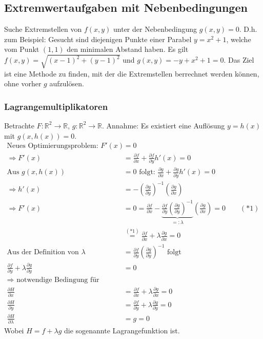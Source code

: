 \documentclass[12pt,a4paper]{report}%
\numberwithin{equation}{section}
\newcommand{\R}{\mathbb{R}} %
\newcommand{\diffp}{\partial}
\numberwithin{equation}{subsection}
\begin{document}
  \subsection{Extremwertaufgaben mit Nebenbedingungen}
  Suche Extremstellen von $f(x,y)$ unter der Nebenbedingung $g(x,y) = 0$.
  D.h. zum Beispiel: Gesucht sind diejenigen Punkte einer Parabel $y = x^2+1$, welche vom Punkt $(1,1)$ den minimalen Abstand haben. Es gilt $f(x,y) = \sqrt{(x-1)^2+(y-1)^2}$ und $g(x,y) = -y+x^2+1 = 0$.\newline
  Das Ziel ist eine Methode zu finden, mit der die Extremstellen berrechnet werden können, ohne vorher $g$ aufzulösen.
  \subsubsection{Lagrangemultiplikatoren}
  Betrachte $F:\R^2 \rightarrow \R$, $g:\R^2 \rightarrow \R$.\newline
  Annahme: Es existiert eine Auflösung $y = h(x)$ mit $g(x,h(x)) = 0$.\newline
  \begin{align*}
    \text{Neues Optimierungsproblem: } F'(x) &= 0 \\
    \Rightarrow F'(x) &= \frac{\diffp f}{\diffp x} + \frac{\diffp f}{\diffp y} h'(x) = 0\\
    \text{Aus } g(x,h(x)) &= 0 \text{ folgt: } \frac{\diffp g}{\diffp x} + \frac{\diffp g}{\diffp y} h'(x) = 0 \\
    \Rightarrow h'(x) &= -\left(\frac{\diffp g}{\diffp y}\right)^{-1} \left(\frac{\diffp g}{\diffp x}\right)\\
    \Rightarrow F'(x) &= 0 = \frac{\diffp f}{\diffp x} - \underbrace{\frac{\diffp f}{\diffp y}\left(\frac{\diffp g}{\diffp y}\right)^{-1}}_{=: \lambda} \left(\frac{\diffp g}{\diffp x}\right) = 0 \qquad (*1)\\
    &\overset{(*1)}{=} \frac{\diffp f}{\diffp x} + \lambda \frac{\diffp g}{\diffp x} = 0\\
    \text{Aus der Definition von } \lambda &= \frac{\diffp f}{\diffp y}\left(\frac{\diffp g}{\diffp y}\right)^{-1} \text{ folgt} \\
    \frac{\diffp f}{\diffp y} + \lambda \frac{\diffp g}{\diffp y} &= 0 \\
    \Rightarrow \text{ notwendige Bedingung für Extremum} \\
    \frac{\diffp H}{\diffp x} &= \frac{\diffp f}{\diffp x} + \lambda \frac{\diffp g}{\diffp x} = 0\\
    \frac{\diffp H}{\diffp y} &= \frac{\diffp f}{\diffp y} + \lambda \frac{\diffp g}{\diffp y} = 0\\
    \frac{\diffp H}{\diffp \lambda} &= g = 0
  \end{align*}
  Wobei $H = f + \lambda g$ die sogenannte Lagrangefunktion ist.
  
\end{document}
